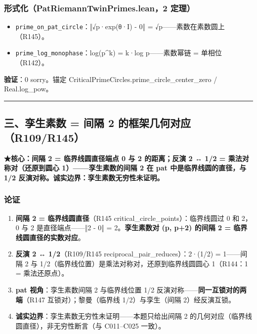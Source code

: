 \documentclass[
]{article}
\providecommand{\tightlist}{%
  \setlength{\itemsep}{0pt}\setlength{\parskip}{0pt}}
\begin{document}
\subsubsection{形式化（PatRiemannTwinPrimes.lean，2
定理）}\label{ux5f62ux5f0fux5316patriemanntwinprimes.lean2-ux5b9aux7406-1}

\begin{itemize}
\tightlist
\item
  \texttt{prime\_on\_pat\_circle}：‖√p·exp(θ·I) - 0‖ =
  √p------素数在素数圆上（R145）。
\item
  \texttt{prime\_log\_monophase}：log(p\^{}k) = k·log p------素数幂链 =
  单相位（R142）。
\end{itemize}

\textbf{验证}：0 sorry。锚定
CriticalPrimeCircles.prime\_circle\_center\_zero / Real.log\_pow。

\begin{center}\rule{0.5\linewidth}{0.5pt}\end{center}

\subsection{三、孪生素数 = 间隔 2
的框架几何对应（R109/R145）}\label{ux4e09ux5b6aux751fux7d20ux6570-ux95f4ux9694-2-ux7684ux6846ux67b6ux51e0ux4f55ux5bf9ux5e94r109r145}

\textbf{★核心：间隔 2 = 临界线圆直径端点 0 与 2 的距离；反演 2 ↔ 1/2 =
乘法对称对（还原到圆心 1）------孪生素数的间隔 2 在 pat
中是临界线圆的直径，与 1/2 反演对称。诚实边界：孪生素数无穷性未证明。}

\subsubsection{论证}\label{ux8bbaux8bc1-2}

\begin{enumerate}
\def\labelenumi{\arabic{enumi}.}
\tightlist
\item
  \textbf{间隔 2 = 临界线圆直径}（R145
  critical\_circle\_points）：临界线圆过 0 和 2，0 与 2
  是直径端点------‖2 - 0‖ = 2。\textbf{孪生素数对 (p, p+2) 的间隔 2 =
  临界线圆直径的实数对应}。
\item
  \textbf{反演 2 ↔ 1/2}（R109/R145 reciprocal\_pair\_reduces）：2·(1/2)
  = 1------间隔 2 与 1/2（临界线位置）是乘法对称对，还原到临界线圆圆心
  1（R144：1 = 乘法还原点）。
\item
  \textbf{pat 视角}：孪生素数间隔 2 与临界线位置 1/2
  反演对称------\textbf{同一互锁对的两端}（R147 互锁对）；黎曼（临界线
  1/2）与孪生（间隔 2）经反演互锁。
\item
  \textbf{诚实边界}：孪生素数无穷性未证明------本题只给出间隔 2
  的几何对应（临界线圆直径），非无穷性断言（与 C011--C025 一致）。
\end{enumerate}
\end{document}
